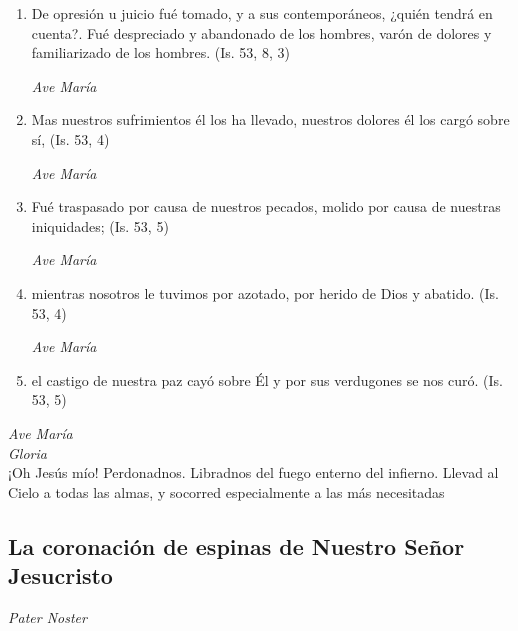 \documentclass[a4paper,11pt, oneside]{report}
\begin{document}
\begin{enumerate}
        \item De opresión u juicio fué tomado, y a sus contemporáneos, ¿quién tendrá en cuenta?. Fué despreciado y abandonado de los hombres,
        varón de dolores y familiarizado de los hombres. (Is. 53, 8, 3)

        \textit{Ave María}

        \item Mas nuestros sufrimientos él los ha llevado, nuestros dolores él los cargó sobre sí, (Is. 53, 4)

        \textit{Ave María}

        \item Fué traspasado por causa de nuestros pecados, molido por causa de nuestras iniquidades; (Is. 53, 5)

        \textit{Ave María}

        \item mientras nosotros le tuvimos por azotado, por herido de Dios y abatido. (Is. 53, 4)

        \textit{Ave María}

        \item el castigo de nuestra paz cayó sobre Él y por sus verdugones se nos curó. (Is. 53, 5)

      \end{enumerate}

      \textit{Ave María} \\
      \indent\textit{Gloria} \\
      \indent¡Oh Jesús mío! Perdonadnos. Libradnos del fuego enterno del infierno. Llevad al Cielo a todas las almas, y socorred especialmente a las más 
      necesitadas
      
    \subsection*{ La coronación de espinas de Nuestro Señor Jesucristo }
      
      \textit{Pater Noster}
\end{document}
